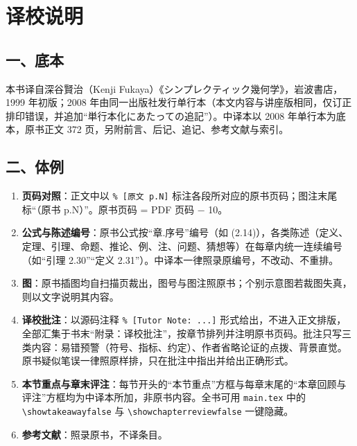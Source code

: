 \chapter*{译校说明}

\section*{一、底本}

本书译自深谷賢治（Kenji Fukaya）《シンプレクティック幾何学》，岩波書店，1999 年初版；2008 年由同一出版社发行单行本（本文内容与讲座版相同，仅订正排印错误，并追加“単行本化にあたっての追記”）。中译本以 2008 年单行本为底本，原书正文 372 页，另附前言、后记、追记、参考文献与索引。

\section*{二、体例}

\begin{enumerate}[label=\arabic*.,leftmargin=2.2em,itemsep=2pt]
  \item \textbf{页码对照}：正文中以 \texttt{\% [原文 p.N]} 标注各段所对应的原书页码；图注末尾标“（原书 p.N）”。原书页码 = PDF 页码 − 10。
  \item \textbf{公式与陈述编号}：原书公式按“章.序号”编号（如 (2.14)），各类陈述（定义、定理、引理、命题、推论、例、注、问题、猜想等）在每章内统一连续编号（如“引理 2.30”“定义 2.31”）。中译本一律照录原编号，不改动、不重排。
  \item \textbf{图}：原书插图均自扫描页裁出，图号与图注照原书；个别示意图若裁图失真，则以文字说明其内容。
  \item \textbf{译校批注}：以源码注释 \texttt{\% [Tutor Note: ...]} 形式给出，不进入正文排版，全部汇集于书末“附录：译校批注”，按章节排列并注明原书页码。批注只写三类内容：易错预警（符号、指标、约定）、作者省略论证的点拨、背景直觉。原书疑似笔误一律照原样排，只在批注中指出并给出正确形式。
  \item \textbf{本节重点与章末评注}：每节开头的“本节重点”方框与每章末尾的“本章回顾与评注”方框均为中译本所加，非原书内容。全书可用 \texttt{main.tex} 中的 \texttt{\textbackslash showtakeawayfalse} 与 \texttt{\textbackslash showchapterreviewfalse} 一键隐藏。
  \item \textbf{参考文献}：照录原书，不译条目。
\end{enumerate}

